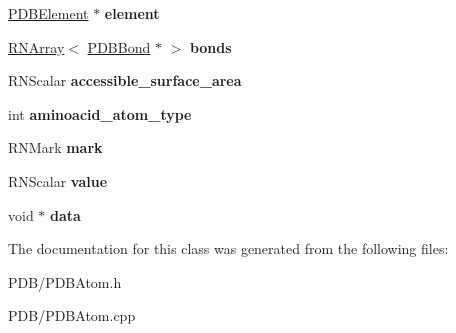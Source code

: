 \begin{DoxyCompactItemize}
\item 
\hyperlink{class_p_d_b_element}{P\+D\+B\+Element} $\ast$ {\bfseries element}\hypertarget{class_p_d_b_atom_a822e17b2012a15267f9da87f9b5102a9}{}\label{class_p_d_b_atom_a822e17b2012a15267f9da87f9b5102a9}

\item 
\hyperlink{class_r_n_array}{R\+N\+Array}$<$ \hyperlink{class_p_d_b_bond}{P\+D\+B\+Bond} $\ast$ $>$ {\bfseries bonds}\hypertarget{class_p_d_b_atom_a6f1cbc25cb8b0ff0861faf831d16fa19}{}\label{class_p_d_b_atom_a6f1cbc25cb8b0ff0861faf831d16fa19}

\item 
R\+N\+Scalar {\bfseries accessible\+\_\+surface\+\_\+area}\hypertarget{class_p_d_b_atom_ac11056727015d0d8166a13d878133a1c}{}\label{class_p_d_b_atom_ac11056727015d0d8166a13d878133a1c}

\item 
int {\bfseries aminoacid\+\_\+atom\+\_\+type}\hypertarget{class_p_d_b_atom_a10233ec055e12477bdd6c31c3d38f06d}{}\label{class_p_d_b_atom_a10233ec055e12477bdd6c31c3d38f06d}

\item 
R\+N\+Mark {\bfseries mark}\hypertarget{class_p_d_b_atom_a8356f7e3915be8cf6ccba557c90e31a1}{}\label{class_p_d_b_atom_a8356f7e3915be8cf6ccba557c90e31a1}

\item 
R\+N\+Scalar {\bfseries value}\hypertarget{class_p_d_b_atom_a3b43cb2b067db95d8a59584b5dabc73c}{}\label{class_p_d_b_atom_a3b43cb2b067db95d8a59584b5dabc73c}

\item 
void $\ast$ {\bfseries data}\hypertarget{class_p_d_b_atom_a6463218cbc3a6a61399a64a018903106}{}\label{class_p_d_b_atom_a6463218cbc3a6a61399a64a018903106}

\end{DoxyCompactItemize}


The documentation for this class was generated from the following files\+:\begin{DoxyCompactItemize}
\item 
P\+D\+B/P\+D\+B\+Atom.\+h\item 
P\+D\+B/P\+D\+B\+Atom.\+cpp\end{DoxyCompactItemize}
